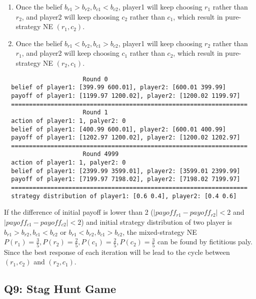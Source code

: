 \documentclass[a4paper, oneside, final, 12pt]{scrartcl} %
\begin{document}
\begin{enumerate}
  \item Once the belief $b_{r1} > b_{r2}, b_{c1} < b_{c2}$,
  player1 will keep choosing $r_1$ rather than $r_2$, 
  and player2 will keep choosing $c_2$ rather than $c_1$, 
  which result in pure-strategy NE $(r_1, c_2)$.
  \item Once the belief $b_{r1} < b_{r2}, b_{c1} > b_{c2}$,
  player1 will keep choosing $r_2$ rather than $r_1$, 
  and player2 will keep choosing $c_1$ rather than $c_2$, 
  which result in pure-strategy NE $(r_2, c_1)$.
\end{enumerate}
\endgroup

\newpage

\begin{lstlisting}
                      Round 0
  belief of player1: [399.99 600.01], player2: [600.01 399.99]
  payoff of player1: [1199.97 1200.02], player2: [1200.02 1199.97]
  ==================================================================
                      Round 1
  action of player1: 1, palyer2: 0
  belief of player1: [400.99 600.01], player2: [600.01 400.99]
  payoff of player1: [1202.97 1200.02], player2: [1200.02 1202.97]
  ==================================================================
                      Round 4999
  action of player1: 1, palyer2: 0
  belief of player1: [2399.99 3599.01], player2: [3599.01 2399.99]
  payoff of player1: [7199.97 7198.02], player2: [7198.02 7199.97]
  ==================================================================
  strategy distribution of player1: [0.6 0.4], player2: [0.4 0.6]
\end{lstlisting}

\begingroup
\raggedright
If the difference of initial payoff is lower than 2
($|payoff_{r1} - payoff_{r2}| < 2$ and $|payoff_{c1} - payoff_{c2}| < 2$)
and initial strategy distribution of two player is 
$b_{r1} > b_{r2}, b_{c1} < b_{c2}$  or  $b_{r1} < b_{r2}, b_{c1} > b_{c2}$, 
the mixed-strategy NE $P(r_1) = \frac{3}{5}, P(r_2) = \frac{2}{5}, 
P(c_1) = \frac{2}{5}, P(c_2) = \frac{3}{5}$ can be found by fictitious paly.
Since the best response of each iteration will be lead to the cycle 
between $(r_1, c_2)$ and $(r_2, c_1)$.
\endgroup

\subsection{Q9: Stag Hunt Game}
\end{document}
